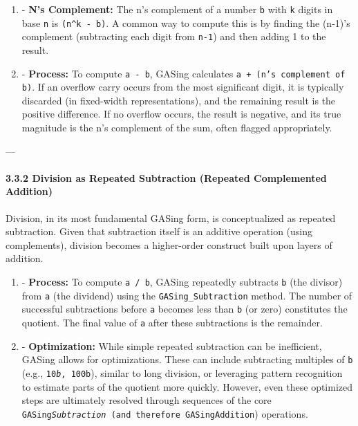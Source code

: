 \documentclass[11pt,a4paper]{article}
\begin{document}
\begin{enumerate}
  \item - \textbf{N's Complement:} The n's complement of a number \texttt{b} with \texttt{k} digits in base \texttt{n} is \texttt{(n^k - b)}. A common way to compute this is by finding the (n-1)'s complement (subtracting each digit from \texttt{n-1}) and then adding 1 to the result.
  \item - \textbf{Process:} To compute \texttt{a - b}, GASing calculates \texttt{a + (n's complement of b)}. If an overflow carry occurs from the most significant digit, it is typically discarded (in fixed-width representations), and the remaining result is the positive difference. If no overflow occurs, the result is negative, and its true magnitude is the n's complement of the sum, often flagged appropriately.
\end{enumerate}



---

\paragraph{3.3.2 Division as Repeated Subtraction (Repeated Complemented Addition)}
Division, in its most fundamental GASing form, is conceptualized as repeated subtraction. Given that subtraction itself is an additive operation (using complements), division becomes a higher-order construct built upon layers of addition.

\begin{enumerate}
  \item - \textbf{Process:} To compute \texttt{a / b}, GASing repeatedly subtracts \texttt{b} (the divisor) from \texttt{a} (the dividend) using the \texttt{GASing_Subtraction} method. The number of successful subtractions before \texttt{a} becomes less than \texttt{b} (or zero) constitutes the quotient. The final value of \texttt{a} after these subtractions is the remainder.
  \item - \textbf{Optimization:} While simple repeated subtraction can be inefficient, GASing allows for optimizations. These can include subtracting multiples of \texttt{b} (e.g., \texttt{10\emph{b}, \texttt{100}b}), similar to long division, or leveraging pattern recognition to estimate parts of the quotient more quickly. However, even these optimized steps are ultimately resolved through sequences of the core \texttt{GASing\emph{Subtraction} (and therefore \texttt{GASing}Addition}) operations.
\end{enumerate}
\end{document}
